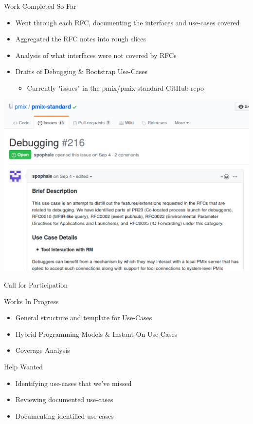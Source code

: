 \documentclass[presentation]{beamer}
\begin{document}
\begin{frame}[label={sec:org1ed18dc}]{Work Completed So Far}
\begin{itemize}
\item Went through each RFC, documenting the interfaces and use-cases covered
\item Aggregated the RFC notes into rough slices
\item Analysis of what interfaces were not covered by RFCs
\item Drafts of Debugging \& Bootstrap Use-Cases
\begin{itemize}
\item Currently "issues" in the pmix/pmix-standard GitHub repo
\end{itemize}
\end{itemize}
\begin{center}
\includegraphics[width=.9\linewidth]{./figures/Debugging.png}
\end{center}
\end{frame}
\begin{frame}[label={sec:org4f50a64}]{Call for Participation}
\begin{block}{Works In Progress}
\begin{itemize}
\item General structure and template for Use-Cases
\item Hybrid Programming Models \& Instant-On Use-Cases
\item Coverage Analysis
\end{itemize}
\end{block}
\begin{block}{Help Wanted}
\begin{itemize}
\item Identifying use-cases that we’ve missed
\item Reviewing documented use-cases
\item Documenting identified use-cases
\end{itemize}
\end{block}
\end{frame}
\end{document}
